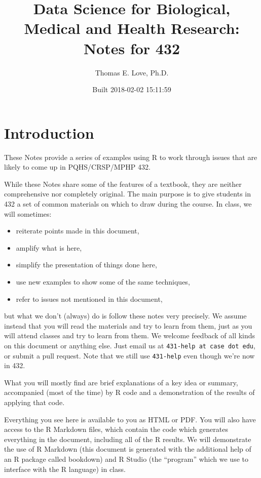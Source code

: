\documentclass[]{book}
\title{Data Science for Biological, Medical and Health Research: Notes for 432}
\author{Thomas E. Love, Ph.D.}
\date{Built 2018-02-02 15:11:59}
\providecommand{\tightlist}{%
  \setlength{\itemsep}{0pt}\setlength{\parskip}{0pt}}
\theoremstyle{definition}
\theoremstyle{definition}
\theoremstyle{definition}
\theoremstyle{remark}
\begin{document}
\maketitle

{
\setcounter{tocdepth}{1}
\tableofcontents
}
\chapter*{Introduction}\label{introduction}

These Notes provide a series of examples using R to work through issues
that are likely to come up in PQHS/CRSP/MPHP 432.

While these Notes share some of the features of a textbook, they are
neither comprehensive nor completely original. The main purpose is to
give students in 432 a set of common materials on which to draw during
the course. In class, we will sometimes:

\begin{itemize}
\tightlist
\item
  reiterate points made in this document,
\item
  amplify what is here,
\item
  simplify the presentation of things done here,
\item
  use new examples to show some of the same techniques,
\item
  refer to issues not mentioned in this document,
\end{itemize}

but what we don't (always) do is follow these notes very precisely. We
assume instead that you will read the materials and try to learn from
them, just as you will attend classes and try to learn from them. We
welcome feedback of all kinds on this document or anything else. Just
email us at \texttt{431-help\ at\ case\ dot\ edu}, or submit a pull
request. Note that we still use \texttt{431-help} even though we're now
in 432.

What you will mostly find are brief explanations of a key idea or
summary, accompanied (most of the time) by R code and a demonstration of
the results of applying that code.

Everything you see here is available to you as HTML or PDF. You will
also have access to the R Markdown files, which contain the code which
generates everything in the document, including all of the R results. We
will demonstrate the use of R Markdown (this document is generated with
the additional help of an R package called bookdown) and R Studio (the
``program'' which we use to interface with the R language) in class.
\end{document}
